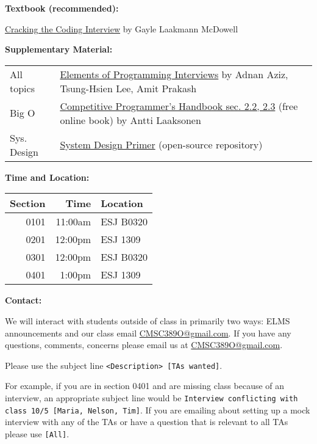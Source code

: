\documentclass[12pt]{article}
\begin{document}
\noindent\textbf{Textbook (recommended): }

\noindent\href{https://www.amazon.com/Cracking-Coding-Interview-Programming-Questions/dp/0984782850/}{Cracking the Coding Interview}
{\small by Gayle Laakmann McDowell} \medskip

\noindent\textbf{Supplementary Material: }

\begin{table}[h!]
  \begin{tabular}{@{}ll}
    All topics & \href{https://www.amazon.com/Elements-Programming-Interviews-Python-Insiders/dp/1537713949}{Elements of Programming Interviews} {\small by Adnan Aziz, Tsung-Hsien Lee, Amit Prakash} \\
    Big O & \href{https://cses.fi/book/index.html}{Competitive Programmer's Handbook sec. 2.2, 2.3} {\small (free online book) by Antti Laaksonen} \\ 
    Sys. Design & \href{https://github.com/donnemartin/system-design-primer}{System Design Primer} (open-source repository)
  \end{tabular}
\end{table}

  
\medskip

\noindent\textbf{Time and Location:}
\begin{table}[h!]
  \begin{tabular}{rrl}
    Section & Time    & Location  \\
    \hline
    0101 & 11:00am & ESJ B0320 \\
    0201 & 12:00pm & ESJ 1309  \\
    0301 & 12:00pm & ESJ B0320 \\
    0401 & 1:00pm  & ESJ 1309 
  \end{tabular}
\end{table}
\medskip

\noindent\textbf{Contact: }

\noindent We will interact with students outside of class in primarily two ways:
ELMS announcements and our class email \href{mailto:CMSC389O@gmail.com}{CMSC389O@gmail.com}.
If you have any questions, comments, concerns please email us at \href{mailto:CMSC389O@gmail.com}{CMSC389O@gmail.com}.

Please use the subject line \texttt{<Description> [TAs wanted]}.

For example, if you are in section 0401 and are missing class because of an interview,
an appropriate subject line would be
\texttt{Interview conflicting with class 10/5 [Maria, Nelson, Tim]}.
If you are emailing about setting up a mock interview with any of the TAs
or have a question that is relevant to all TAs please use \texttt{[All]}.
\end{document}
